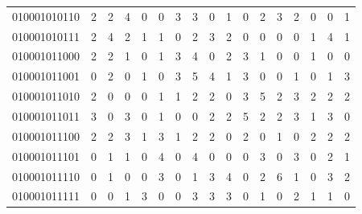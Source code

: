 \documentclass[10pt,a4paper]{article}
\begin{document}
\begin{longtable}{ |c|c|c|c|c|c|c|c|c|c|c|c|c|c|c|c|c| }
    010001010110              & 2                            & 2                                & 4                            & 0                              & 0   & 3   & 3   & 0   & 1   & 0   & 2   & 3   & 2   & 0   & 0   & 1   \\
    010001010111              & 2                            & 4                                & 2                            & 1                              & 1   & 0   & 2   & 3   & 2   & 0   & 0   & 0   & 0   & 1   & 4   & 1   \\
    010001011000              & 2                            & 2                                & 1                            & 0                              & 1   & 3   & 4   & 0   & 2   & 3   & 1   & 0   & 0   & 1   & 0   & 0   \\
    010001011001              & 0                            & 2                                & 0                            & 1                              & 0   & 3   & 5   & 4   & 1   & 3   & 0   & 0   & 1   & 0   & 1   & 3   \\
    010001011010              & 2                            & 0                                & 0                            & 0                              & 1   & 1   & 2   & 2   & 0   & 3   & 5   & 2   & 3   & 2   & 2   & 2   \\
    010001011011              & 3                            & 0                                & 3                            & 0                              & 1   & 0   & 0   & 2   & 2   & 5   & 2   & 2   & 3   & 1   & 3   & 0   \\
    010001011100              & 2                            & 2                                & 3                            & 1                              & 3   & 1   & 2   & 2   & 0   & 2   & 0   & 1   & 0   & 2   & 2   & 2   \\
    010001011101              & 0                            & 1                                & 1                            & 0                              & 4   & 0   & 4   & 0   & 0   & 0   & 3   & 0   & 3   & 0   & 2   & 1   \\
    010001011110              & 0                            & 1                                & 0                            & 0                              & 3   & 0   & 1   & 3   & 4   & 0   & 2   & 6   & 1   & 0   & 3   & 2   \\
    010001011111              & 0                            & 0                                & 1                            & 3                              & 0   & 0   & 3   & 3   & 3   & 0   & 1   & 0   & 2   & 1   & 1   & 0   \\

\end{longtable}
\end{document}
